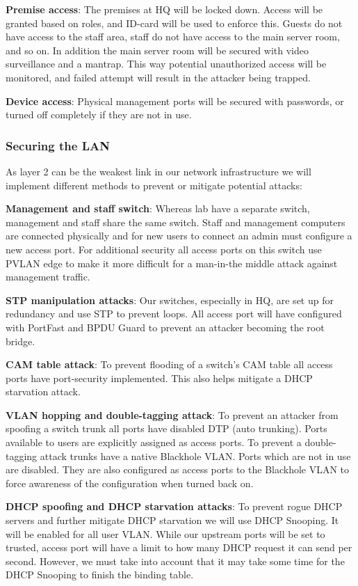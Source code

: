 \textbf{Premise access}: The premises at HQ will be locked down. Access will be granted based on roles, and ID-card will be used to enforce this. Guests do not have access to the staff area, staff do not have access to the main server room, and so on. In addition the main server room will be secured with video surveillance and a mantrap. This way potential unauthorized access will be monitored, and failed attempt will result in the attacker being trapped.

\textbf{Device access}: Physical management ports will be secured with passwords, or turned off completely if they are not in use.

\subsubsection{Securing the LAN}
As layer 2 can be the weakest link in our network infrastructure we will implement different methods to prevent or mitigate potential attacks:

\textbf{Management and staff switch}: Whereas lab have a separate switch, management and staff share the same switch. Staff and management computers are connected physically and for new users to connect an admin must configure a new access port. For additional security all access ports on this switch use PVLAN edge to make it more difficult for a man-in-the middle attack against management traffic.

\textbf{STP manipulation attacks}: Our switches, especially in HQ, are set up for redundancy and use STP to prevent loops. All access port will have configured with PortFast and BPDU Guard to prevent an attacker becoming the root bridge.

\textbf{CAM table attack}: To prevent flooding of a switch's CAM table all access ports have port-security implemented. This also helps mitigate a DHCP starvation attack.

\textbf{VLAN hopping and double-tagging attack}: To prevent an attacker from spoofing a switch trunk all ports have disabled DTP (auto trunking). Ports available to users are explicitly assigned as access ports. To prevent a double-tagging attack trunks have a native Blackhole VLAN. Ports which are not in use are disabled. They are also configured as access ports to the Blackhole VLAN to force awareness of the configuration when turned back on.

\textbf{DHCP spoofing and DHCP starvation attacks}: To prevent rogue DHCP servers and further mitigate DHCP starvation we will use DHCP Snooping. It will be enabled for all user VLAN. While our upstream ports will be set to trusted, access port will have a limit to how many DHCP request it can send per second. However, we must take into account that it may take some time for the DHCP Snooping to finish the binding table. 

